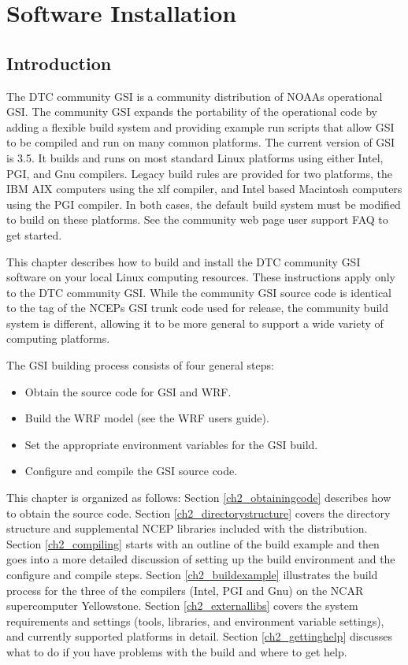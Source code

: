 \chapter{Software Installation}
\setlength{\parskip}{12pt}

\section{Introduction}

The DTC community GSI is a community distribution of NOAA\textquotesingle s operational GSI. 
The community GSI expands the portability of the operational code by adding a flexible build 
system and providing example run scripts that allow GSI to be compiled and run on many common 
platforms. The current version of GSI is 3.5. It builds and runs on most standard
Linux platforms using either Intel, PGI, and Gnu compilers. Legacy build rules are provided for 
two platforms, the IBM AIX computers using the xlf compiler, and Intel based Macintosh 
computers using the PGI compiler. In both cases, the default build system must be modified to 
build on these platforms. See the community web page user support FAQ to get started.

This chapter describes how to build and install the DTC community GSI software on your local 
Linux computing resources. These instructions apply only to the DTC community GSI. While 
the community GSI source code is identical to the tag of the NCEP\textquotesingle s GSI 
trunk code used for release, the community build system is different, allowing it to be more 
general to support a wide variety of computing platforms.

The GSI building process consists of four general steps:
\begin{itemize}
\item Obtain the source code for GSI and WRF.
\item Build the WRF model (see the WRF users guide).
\item Set the appropriate environment variables for the GSI build.
\item Configure and compile the GSI source code.
\end{itemize}

This chapter is organized as follows: Section \ref{ch2_obtainingcode} describes how to obtain 
the source code. Section \ref{ch2_directorystructure} covers the directory structure and 
supplemental NCEP libraries included with the distribution. Section \ref{ch2_compiling} starts 
with an outline of the build example and then goes into a more detailed discussion of setting 
up the build environment and the configure and compile steps. 
Section \ref{ch2_buildexample} illustrates the build process for the three of the compilers (Intel, 
PGI and Gnu) on the NCAR supercomputer Yellowstone. 
Section \ref{ch2_externallibs} covers the system requirements and settings (tools, libraries, and environment 
variable settings), and currently supported platforms in detail. 
Section \ref{ch2_gettinghelp} discusses what to do if you have problems with the build and where to get help.

